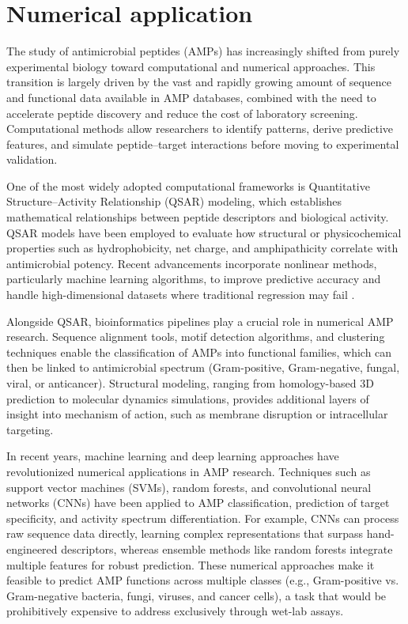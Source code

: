 \documentclass[a4paper,twoside,12pt]{book}
\begin{document}
\section{Numerical application}
The study of antimicrobial peptides (AMPs) has increasingly shifted from purely experimental biology toward computational and numerical approaches. This transition is largely driven by the vast and rapidly growing amount of sequence and functional data available in AMP databases, combined with the need to accelerate peptide discovery and reduce the cost of laboratory screening. Computational methods allow researchers to identify patterns, derive predictive features, and simulate peptide–target interactions before moving to experimental validation.

One of the most widely adopted computational frameworks is Quantitative Structure–Activity Relationship (QSAR) modeling, which establishes mathematical relationships between peptide descriptors and biological activity. QSAR models have been employed to evaluate how structural or physicochemical properties such as hydrophobicity, net charge, and amphipathicity correlate with antimicrobial potency. Recent advancements incorporate nonlinear methods, particularly machine learning algorithms, to improve predictive accuracy and handle high-dimensional datasets where traditional regression may fail \cite{bib:perisic2025}.

Alongside QSAR, bioinformatics pipelines play a crucial role in numerical AMP research. Sequence alignment tools, motif detection algorithms, and clustering techniques enable the classification of AMPs into functional families, which can then be linked to antimicrobial spectrum (Gram-positive, Gram-negative, fungal, viral, or anticancer). Structural modeling, ranging from homology-based 3D prediction to molecular dynamics simulations, provides additional layers of insight into mechanism of action, such as membrane disruption or intracellular targeting.

In recent years, machine learning and deep learning approaches have revolutionized numerical applications in AMP research. Techniques such as support vector machines (SVMs), random forests, and convolutional neural networks (CNNs) have been applied to AMP classification, prediction of target specificity, and activity spectrum differentiation. For example, CNNs can process raw sequence data directly, learning complex representations that surpass hand-engineered descriptors, whereas ensemble methods like random forests integrate multiple features for robust prediction. These numerical approaches make it feasible to predict AMP functions across multiple classes (e.g., Gram-positive vs. Gram-negative bacteria, fungi, viruses, and cancer cells), a task that would be prohibitively expensive to address exclusively through wet-lab assays.
\end{document}
